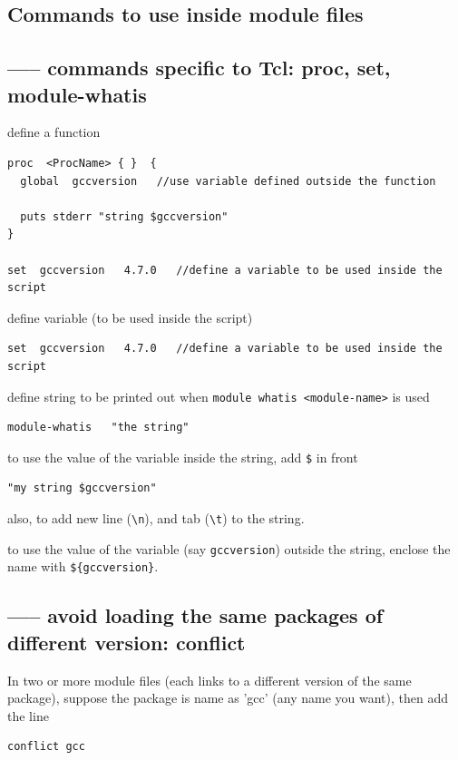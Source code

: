 \subsection{Commands to use inside module files}

\subsection{----- commands specific to Tcl: proc, set, module-whatis}
\label{sec:module-whatis}
\label{sec:proc-Modules}
\label{sec:set-Modules}

define a function
\begin{verbatim}
proc  <ProcName> { }  {
  global  gccversion   //use variable defined outside the function

  puts stderr "string $gccversion"
}

set  gccversion   4.7.0   //define a variable to be used inside the script
\end{verbatim}

define variable (to be used inside the script)
\begin{verbatim}
set  gccversion   4.7.0   //define a variable to be used inside the script
\end{verbatim}

define string to be printed out when \verb!module whatis <module-name>! is used
\begin{verbatim}
module-whatis   "the string"
\end{verbatim}

to use the value of the variable inside the string, add \verb!$! in front
\begin{verbatim}
"my string $gccversion"
\end{verbatim}
also, to add new line (\verb!\n!), and tab (\verb!\t!) to the string.

to use the value of the variable (say \verb!gccversion!) outside the string,
enclose the name with \verb!${gccversion}!.


\subsection{----- avoid loading the same packages of different version:
conflict}

In two or more module files (each links to a different version of the same
package), suppose the package is name as 'gcc' (any name you want), then add the
line
\begin{verbatim}
conflict gcc
\end{verbatim}

